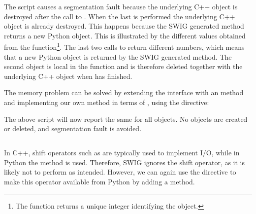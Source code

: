 \vspace*{3pt}

\noindent The script causes a segmentation fault because the underlying C++ object
is destroyed after the call to . When the last  is
performed the underlying C++ object is already destroyed. This happens
because the SWIG generated  method returns a new
Python object. This is illustrated by the different values obtained from
the  function\footnote{The  function returns a unique
integer identifying the object.}. The last two calls to  return
different numbers, which means that a new Python object is returned by
the SWIG generated  method. The second  object
is local in the  function and is therefore deleted together
with the underlying C++ object when  has finished.

The memory problem can be solved by extending the interface with an
 method and implementing our own  method
in terms of , using the  directive:\vspace*{1.5pt}

\vspace*{3pt}

\noindent The above script will now report the same  for all objects.
No objects are created or deleted, and segmentation fault is avoided.

\vspace*{3pt}
\subsection{}%

In C++, shift operators such as  are typically used
to implement I/O, while in Python the  method is used.
Therefore, SWIG ignores the shift operator, as it is likely not to perform
as intended.  However, we can again use the  directive to
make this operator available from Python by adding a 
method.\vspace*{1.5pt}

